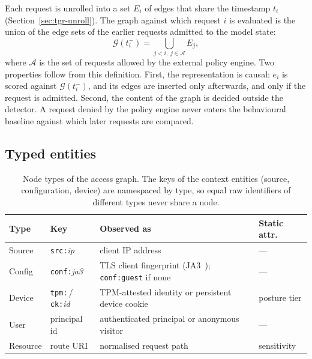 Each request is unrolled into a set $E_i$ of edges that share the timestamp $t_i$
(Section~\ref{sec:tgr-unroll}). The graph against which request $i$ is evaluated is the
union of the edge sets of the earlier requests admitted to the model state:
\begin{equation}
  \mathcal{G}(t_i^-) = \bigcup_{j < i,\; j \in \mathcal{A}} E_j ,
  \label{eq:tgr-graph}
\end{equation}
where $\mathcal{A}$ is the set of requests allowed by the external policy engine. Two
properties follow from this definition. First, the representation is causal: $e_i$ is
scored against $\mathcal{G}(t_i^-)$, and its edges are inserted only afterwards, and
only if the request is admitted. Second, the content of the graph is decided outside
the detector. A request denied by the policy engine never enters the behavioural
baseline against which later requests are compared.

\subsection{Typed entities}
\label{sec:tgr-nodes}

\begin{table}[t]
\centering
\caption{Node types of the access graph. The keys of the context entities (source,
configuration, device) are namespaced by type, so equal raw identifiers of different
types never share a node.}
\label{tab:tgr-nodes}
\footnotesize
\setlength{\tabcolsep}{3pt}
\begin{tabular}{@{}l l p{} l@{}}
\toprule
Type & Key & Observed as & Static attr. \\
\midrule
Source   & \texttt{src:}\textit{ip}    & client IP address                                  & --- \\
Config   & \texttt{conf:}\textit{ja3}  & TLS client fingerprint (JA3~\cite{ja3});
                                         \texttt{conf:guest} if none                        & --- \\
Device   & \texttt{tpm:}\,/\,\texttt{ck:}\textit{id}
                                       & TPM-attested identity or persistent device cookie  & posture tier \\
User     & principal id                & authenticated principal or anonymous visitor       & --- \\
Resource & route URI                   & normalised request path                            & sensitivity \\
\bottomrule
\end{tabular}
\end{table}


